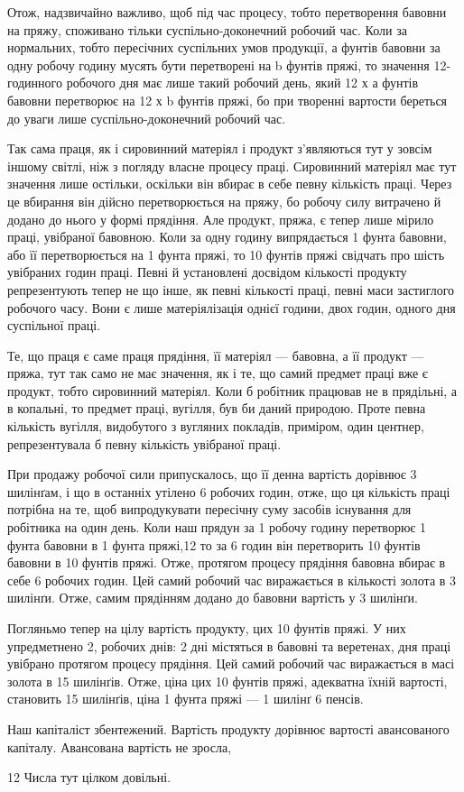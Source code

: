 Отож, надзвичайно важливо, щоб під час процесу, тобто перетворення
бавовни на пряжу, споживано тільки суспільно-доконечний
робочий час. Коли за нормальних, тобто пересічних
суспільних умов продукції, а фунтів бавовни за одну робочу
годину мусять бути перетворені на b фунтів пряжі, то значення
12-годинного робочого дня має лише такий робочий день, який
12 х а фунтів бавовни перетворює на 12 х b фунтів пряжі, бо
при творенні вартости береться до уваги лише суспільно-доконечний
робочий час.

Так сама праця, як і сировинний матеріял і продукт з’являються
тут у зовсім іншому світлі, ніж з погляду власне процесу
праці. Сировинний матеріял має тут значення лише остільки,
оскільки він вбирає в себе певну кількість праці. Через це вбирання
він дійсно перетворюється на пряжу, бо робочу силу витрачено
й додано до нього у формі прядіння. Але продукт, пряжа,
є тепер лише мірило праці, увібраної бавовною. Коли за одну
годину випрядається 1 фунта бавовни, або її перетворюється на
1 фунта пряжі, то 10 фунтів пряжі свідчать про шість увібраних
годин праці. Певні й установлені досвідом кількості продукту
репрезентують тепер не що інше, як певні кількості праці, певні
маси застиглого робочого часу. Вони є лише матеріялізація однієї
години, двох годин, одного дня суспільної праці.

Те, що праця є саме праця прядіння, її матеріял — бавовна,
а її продукт — пряжа, тут так само не має значення, як і те, що
самий предмет праці вже є продукт, тобто сировинний матеріял.
Коли б робітник працював не в прядільні, а в копальні, то предмет
праці, вугілля, був би даний природою. Проте певна кількість
вугілля, видобутого з вугляних покладів, приміром, один
центнер, репрезентувала б певну кількість увібраної праці.

При продажу робочої сили припускалось, що її денна вартість
дорівнює 3 шилінґам, і що в останніх утілено 6 робочих годин,
отже, що ця кількість праці потрібна на те, щоб випродукувати
пересічну суму засобів існування для робітника на один день.
Коли наш прядун за 1 робочу годину перетворює 1 фунта
бавовни в 1 фунта пряжі,12 то за 6 годин він перетворить
10 фунтів бавовни в 10 фунтів пряжі. Отже, протягом процесу
прядіння бавовна вбирає в себе 6 робочих годин. Цей самий робочий
час виражається в кількості золота в 3 шилінґи. Отже, самим
прядінням додано до бавовни вартість у 3 шилінґи.

Погляньмо тепер на цілу вартість продукту, цих 10 фунтів
пряжі. У них упредметнено 2, робочих днів: 2 дні містяться в
бавовні та веретенах,  дня праці увібрано протягом процесу прядіння.
Цей самий робочий час виражається в масі золота в 15 шилінґів.
Отже, ціна цих 10 фунтів пряжі, адекватна їхній вартості,
становить 15 шилінґів, ціна 1 фунта пряжі — 1 шилінґ 6 пенсів.

Наш капіталіст збентежений. Вартість продукту дорівнює
вартості авансованого капіталу. Авансована вартість не зросла,

12 Числа тут цілком довільні.
